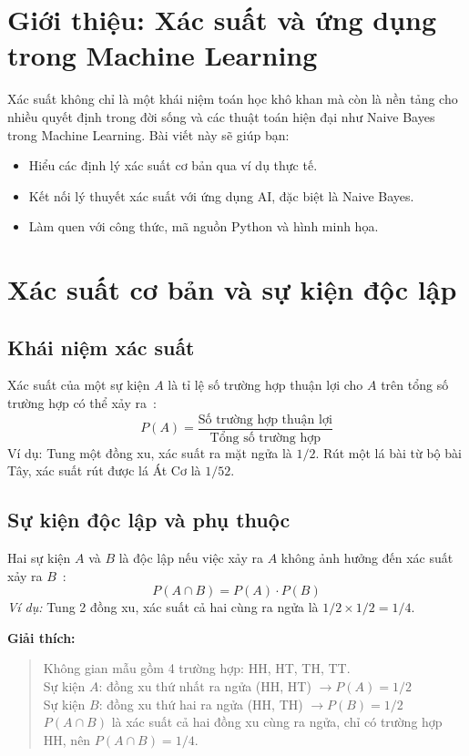 \section{Giới thiệu: Xác suất và ứng dụng trong Machine Learning}

Xác suất không chỉ là một khái niệm toán học khô khan mà còn là nền tảng cho nhiều quyết định trong đời sống và các thuật toán hiện đại như Naive Bayes trong Machine Learning. Bài viết này sẽ giúp bạn:

\begin{itemize}
    \item Hiểu các định lý xác suất cơ bản qua ví dụ thực tế.
    \item Kết nối lý thuyết xác suất với ứng dụng AI, đặc biệt là Naive Bayes.
    \item Làm quen với công thức, mã nguồn Python và hình minh họa.
\end{itemize}

\section{Xác suất cơ bản và sự kiện độc lập}

\subsection{Khái niệm xác suất}

Xác suất của một sự kiện $A$ là tỉ lệ số trường hợp thuận lợi cho $A$ trên tổng số trường hợp có thể xảy ra~\cite{bishop2006pattern}:
\[
P(A) = \frac{\text{Số trường hợp thuận lợi}}{\text{Tổng số trường hợp}}
\]
Ví dụ: Tung một đồng xu, xác suất ra mặt ngửa là $1/2$. Rút một lá bài từ bộ bài Tây, xác suất rút được lá Át Cơ là $1/52$.

\subsection{Sự kiện độc lập và phụ thuộc}

Hai sự kiện $A$ và $B$ là độc lập nếu việc xảy ra $A$ không ảnh hưởng đến xác suất xảy ra $B$~\cite{bishop2006pattern}:
\[
P(A \cap B) = P(A) \cdot P(B)
\]
\textit{Ví dụ:} Tung 2 đồng xu, xác suất cả hai cùng ra ngửa là $1/2 \times 1/2 = 1/4$.

\textbf{Giải thích:}
\begin{quote}
Không gian mẫu gồm 4 trường hợp: HH, HT, TH, TT.\\
Sự kiện $A$: đồng xu thứ nhất ra ngửa (HH, HT) $\rightarrow P(A) = 1/2$\\
Sự kiện $B$: đồng xu thứ hai ra ngửa (HH, TH) $\rightarrow P(B) = 1/2$\\
$P(A \cap B)$ là xác suất cả hai đồng xu cùng ra ngửa, chỉ có trường hợp HH, nên $P(A \cap B) = 1/4$.
\end{quote}

